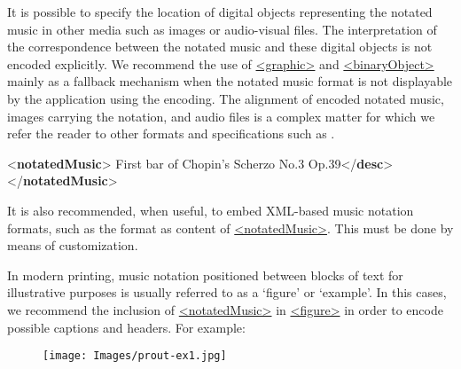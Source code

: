 It is possible to specify the location of digital objects representing the notated music in other media such as images or audio-visual files. The interpretation of the correspondence between the notated music and these digital objects is not encoded explicitly. We recommend the use of \hyperref[TEI.graphic]{<graphic>} and \hyperref[TEI.binaryObject]{<binaryObject>} mainly as a fallback mechanism when the notated music format is not displayable by the application using the encoding. The alignment of encoded notated music, images carrying the notation, and audio files is a complex matter for which we refer the reader to other formats and specifications such as .\par\bgroup{}\exampleFont \begin{shaded}\noindent\mbox{}{<\textbf{notatedMusic}>}\mbox{}\newline 
{}\mbox{}\newline 
{}\mbox{}\newline 
{}First bar of Chopin's Scherzo No.3 Op.39{</\textbf{desc}>}\mbox{}\newline 
{</\textbf{notatedMusic}>}\end{shaded}\egroup\par \par
It is also recommended, when useful, to embed XML-based music notation formats, such as the  format as content of \hyperref[TEI.notatedMusic]{<notatedMusic>}. This must be done by means of customization.\par
In modern printing, music notation positioned between blocks of text for illustrative purposes is usually referred to as a ‘figure’ or ‘example’. In this cases, we recommend the inclusion of \hyperref[TEI.notatedMusic]{<notatedMusic>} in \hyperref[TEI.figure]{<figure>} in order to encode possible captions and headers. For example:\begin{figure}[htbp]
\noindent\texttt{[image: Images/prout-ex1.jpg]}\end{figure}

